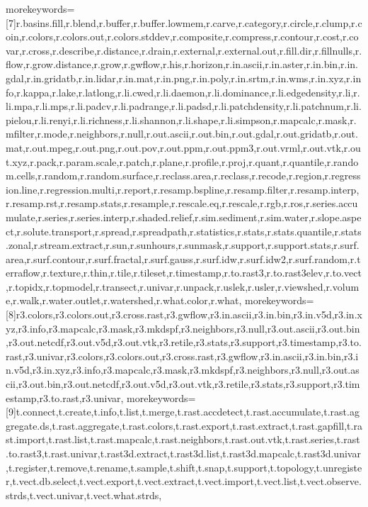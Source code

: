 {morekeywords=[7]{r.basins.fill,r.blend,r.buffer,r.buffer.lowmem,r.carve,r.category,r.circle,r.clump,r.coin,r.colors,r.colors.out,r.colors.stddev,r.composite,r.compress,r.contour,r.cost,r.covar,r.cross,r.describe,r.distance,r.drain,r.external,r.external.out,r.fill.dir,r.fillnulls,r.flow,r.grow.distance,r.grow,r.gwflow,r.his,r.horizon,r.in.ascii,r.in.aster,r.in.bin,r.in.gdal,r.in.gridatb,r.in.lidar,r.in.mat,r.in.png,r.in.poly,r.in.srtm,r.in.wms,r.in.xyz,r.info,r.kappa,r.lake,r.latlong,r.li.cwed,r.li.daemon,r.li.dominance,r.li.edgedensity,r.li,r.li.mpa,r.li.mps,r.li.padcv,r.li.padrange,r.li.padsd,r.li.patchdensity,r.li.patchnum,r.li.pielou,r.li.renyi,r.li.richness,r.li.shannon,r.li.shape,r.li.simpson,r.mapcalc,r.mask,r.mfilter,r.mode,r.neighbors,r.null,r.out.ascii,r.out.bin,r.out.gdal,r.out.gridatb,r.out.mat,r.out.mpeg,r.out.png,r.out.pov,r.out.ppm,r.out.ppm3,r.out.vrml,r.out.vtk,r.out.xyz,r.pack,r.param.scale,r.patch,r.plane,r.profile,r.proj,r.quant,r.quantile,r.random.cells,r.random,r.random.surface,r.reclass.area,r.reclass,r.recode,r.region,r.regression.line,r.regression.multi,r.report,r.resamp.bspline,r.resamp.filter,r.resamp.interp,r.resamp.rst,r.resamp.stats,r.resample,r.rescale.eq,r.rescale,r.rgb,r.ros,r.series.accumulate,r.series,r.series.interp,r.shaded.relief,r.sim.sediment,r.sim.water,r.slope.aspect,r.solute.transport,r.spread,r.spreadpath,r.statistics,r.stats,r.stats.quantile,r.stats.zonal,r.stream.extract,r.sun,r.sunhours,r.sunmask,r.support,r.support.stats,r.surf.area,r.surf.contour,r.surf.fractal,r.surf.gauss,r.surf.idw,r.surf.idw2,r.surf.random,r.terraflow,r.texture,r.thin,r.tile,r.tileset,r.timestamp,r.to.rast3,r.to.rast3elev,r.to.vect,r.topidx,r.topmodel,r.transect,r.univar,r.unpack,r.uslek,r.usler,r.viewshed,r.volume,r.walk,r.water.outlet,r.watershed,r.what.color,r.what},
morekeywords=[8]{r3.colors,r3.colors.out,r3.cross.rast,r3.gwflow,r3.in.ascii,r3.in.bin,r3.in.v5d,r3.in.xyz,r3.info,r3.mapcalc,r3.mask,r3.mkdspf,r3.neighbors,r3.null,r3.out.ascii,r3.out.bin,r3.out.netcdf,r3.out.v5d,r3.out.vtk,r3.retile,r3.stats,r3.support,r3.timestamp,r3.to.rast,r3.univar,r3.colors,r3.colors.out,r3.cross.rast,r3.gwflow,r3.in.ascii,r3.in.bin,r3.in.v5d,r3.in.xyz,r3.info,r3.mapcalc,r3.mask,r3.mkdspf,r3.neighbors,r3.null,r3.out.ascii,r3.out.bin,r3.out.netcdf,r3.out.v5d,r3.out.vtk,r3.retile,r3.stats,r3.support,r3.timestamp,r3.to.rast,r3.univar},
morekeywords=[9]{t.connect,t.create,t.info,t.list,t.merge,t.rast.accdetect,t.rast.accumulate,t.rast.aggregate.ds,t.rast.aggregate,t.rast.colors,t.rast.export,t.rast.extract,t.rast.gapfill,t.rast.import,t.rast.list,t.rast.mapcalc,t.rast.neighbors,t.rast.out.vtk,t.rast.series,t.rast.to.rast3,t.rast.univar,t.rast3d.extract,t.rast3d.list,t.rast3d.mapcalc,t.rast3d.univar,t.register,t.remove,t.rename,t.sample,t.shift,t.snap,t.support,t.topology,t.unregister,t.vect.db.select,t.vect.export,t.vect.extract,t.vect.import,t.vect.list,t.vect.observe.strds,t.vect.univar,t.vect.what.strds},
}
